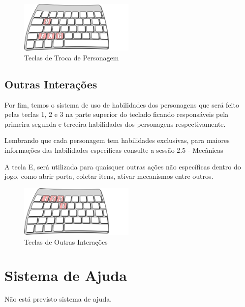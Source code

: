 \begin{figure}[!htb] \caption{\label{fig_tecladoTroca}Teclas de Troca de Personagem} \begin{center}
\includegraphics[width=0.5\textwidth]{imagens/tecladoTroca.png} \end{center}
 \end{figure}

\subsection{Outras Interações}

Por fim, temos o sistema de uso de habilidades dos personagens que será feito pelas teclas 1, 2 e 3 na parte superior do teclado ficando responsáveis pela primeira segunda e terceira habilidades dos personagens respectivamente. 

Lembrando que cada personagem tem habilidades exclusivas, para maiores informações das habilidades específicas consulte a sessão 2.5 - Mecânicas

A tecla E, será utilizada para quaisquer outras ações não específicas dentro do jogo, como abrir porta, coletar itens, ativar mecanismos entre outros.

\begin{figure}[!htb] \caption{\label{fig_tecladoOutras}Teclas de Outras Interações} \begin{center}
\includegraphics[width=0.5\textwidth]{imagens/tecladoOutros.png} \end{center}
 \end{figure}



\section{Sistema de Ajuda}

Não está previsto sistema de ajuda.